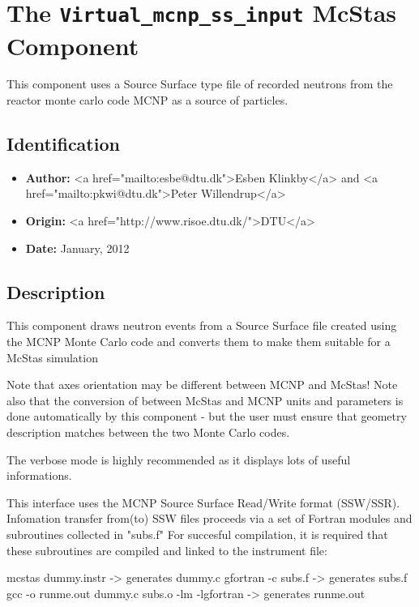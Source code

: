 \section{The \texttt{Virtual\_mcnp\_ss\_input} McStas Component}
This component uses a Source Surface type file of recorded neutrons from the
reactor monte carlo code MCNP as a source of particles.

\subsection*{Identification}
\begin{itemize}
  \item \textbf{Author:} \textless{}a href="mailto:esbe@dtu.dk"\textgreater{}Esben Klinkby\textless{}/a\textgreater{} and \textless{}a href="mailto:pkwi@dtu.dk"\textgreater{}Peter Willendrup\textless{}/a\textgreater{}
  \item \textbf{Origin:} \textless{}a href="http://www.risoe.dtu.dk/"\textgreater{}DTU\textless{}/a\textgreater{}
  \item \textbf{Date:} January, 2012
\end{itemize}

\subsection*{Description}
This component draws neutron events from a Source Surface file created using the MCNP Monte Carlo code and converts them to make them suitable for a McStas simulation

Note that axes orientation may be different between MCNP and McStas! Note also that the conversion of between McStas and MCNP units and parameters is done automatically by this component - but the user must ensure that geometry description matches between the two Monte Carlo codes.

The verbose mode is highly recommended as it displays lots of useful informations.

This interface uses the MCNP Source Surface Read/Write format (SSW/SSR). Infomation transfer from(to) SSW files proceeds via a set of Fortran modules and subroutines collected in "subs.f" For succesful compilation, it is required that these subroutines are compiled and linked to the instrument file:

mcstas dummy.instr -\textgreater{} generates dummy.c gfortran -c subs.f -\textgreater{} generates subs.f gcc -o runme.out dummy.c subs.o -lm -lgfortran -\textgreater{} generates runme.out

